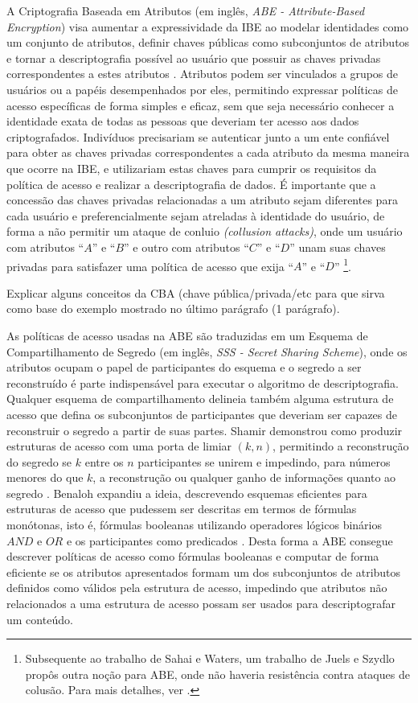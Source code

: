 \documentclass[a4paper,11pt]{article}
\begin{document}
A Criptografia Baseada em Atributos (em inglês, \emph{ABE - Attribute-Based Encryption}) visa aumentar a expressividade da IBE ao modelar identidades como um conjunto de atributos, definir chaves públicas como subconjuntos de atributos e tornar a descriptografia possível ao usuário que possuir as chaves privadas correspondentes a estes atributos \cite{Sahai2005}.
Atributos podem ser vinculados a grupos de usuários ou a papéis desempenhados por eles, permitindo expressar políticas de acesso específicas de forma simples e eficaz, sem que seja necessário conhecer a identidade exata de todas as pessoas que deveriam ter acesso aos dados criptografados.
Indivíduos precisariam se autenticar junto a um ente confiável para obter as chaves privadas correspondentes a cada atributo da mesma maneira que ocorre na IBE, e utilizariam estas chaves para cumprir os requisitos da política de acesso e realizar a descriptografia de dados.
É importante que a concessão das chaves privadas relacionadas a um atributo sejam diferentes para cada usuário e preferencialmente sejam
atreladas à identidade do usuário, de forma a não permitir um ataque de conluio \emph{(collusion attacks)}, onde um usuário com atributos ``$A$'' e ``$B$'' e outro com atributos ``$C$'' e ``$D$'' unam suas chaves privadas para satisfazer uma política de acesso que exija ``$A$'' e ``$D$'' \footnote{Subsequente ao trabalho de Sahai e Waters, um trabalho de Juels e Szydlo propôs outra noção para ABE, onde não haveria resistência contra ataques de colusão. Para mais detalhes, ver \cite{Juels2004}.}.

{\color{ForestGreen}Explicar alguns conceitos da CBA (chave pública/privada/etc para que sirva como base do exemplo mostrado no último parágrafo (1 parágrafo).}

As políticas de acesso usadas na ABE são traduzidas em um Esquema de Compartilhamento de Segredo (em inglês, \emph{SSS - Secret Sharing Scheme}), onde os atributos ocupam o papel de participantes do esquema e o segredo a ser reconstruído é parte indispensável para executar o algoritmo de descriptografia.
Qualquer esquema de compartilhamento delineia também alguma estrutura de acesso que defina os subconjuntos de participantes que deveriam ser capazes de reconstruir o segredo a partir de suas partes.
Shamir demonstrou como produzir estruturas de acesso com uma porta de limiar $(k,n)$, permitindo a reconstrução do segredo se $k$ entre os $n$ participantes se unirem e impedindo, para números menores do que $k$, a reconstrução ou qualquer ganho de informações quanto ao segredo \cite{Shamir1979}.
Benaloh expandiu a ideia, descrevendo esquemas eficientes para estruturas de acesso que pudessem ser descritas em termos de fórmulas monótonas, isto é, fórmulas booleanas utilizando operadores lógicos binários $AND$ e $OR$ e os participantes como predicados \cite{Benaloh1988}.
Desta forma a ABE consegue descrever políticas de acesso como fórmulas booleanas e computar de forma eficiente se os atributos apresentados formam um dos subconjuntos de atributos definidos como válidos pela estrutura de acesso, impedindo que atributos não relacionados a uma estrutura de acesso possam ser usados para descriptografar um conteúdo.
\end{document}
